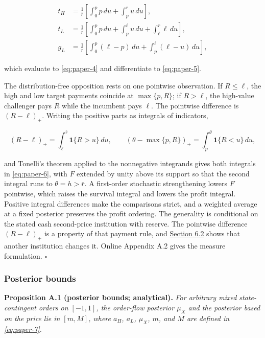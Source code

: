 \documentclass[
  12pt,
]{article}
\begin{document}
\[
\begin{aligned}
t_H&=\frac1r\left[\int_0^p p\,du+\int_p^r u\,du\right],\\
t_L&=\frac1r\left[\int_0^p p\,du+\int_p^\ell u\,du+\int_\ell^r\ell\,du\right],\\
g_L&=\frac1r\left[\int_0^p(\ell-p)\,du+\int_p^\ell(\ell-u)\,du\right],
\end{aligned}
\tag{A.1}\label{eq:paper-a-1}
\]

which evaluate to \eqref{eq:paper-4} and differentiate to
\eqref{eq:paper-5}.

The distribution-free opposition rests on one pointwise observation. If
\(R\le\ell\), the high and low target payments coincide at
\(\max\{p,R\}\); if \(R>\ell\), the high-value challenger pays \(R\)
while the incumbent pays \(\ell\). The pointwise difference is
\((R-\ell)_+\). Writing the positive parts as integrals of indicators,

\[
(R-\ell)_+=\int_\ell^{\bar r}\mathbf1\{R>u\}\,du,
\qquad
(\theta-\max\{p,R\})_+=\int_p^\theta\mathbf1\{R<u\}\,du,
\tag{A.2}\label{eq:paper-a-2}
\]

and Tonelli's theorem applied to the nonnegative integrands gives both
integrals in \eqref{eq:paper-6}, with \(F\) extended by unity above its
support so that the second integral runs to \(\theta=h>\bar r\). A
first-order stochastic strengthening lowers \(F\) pointwise, which
raises the survival integral and lowers the profit integral. Positive
integral differences make the comparisons strict, and a weighted average
at a fixed posterior preserves the profit ordering. The generality is
conditional on the stated cash second-price institution with reserve.
The pointwise difference \((R-\ell)_+\) is a property of that payment
rule, and \hyperref[sec-the-payment-rule]{Section 6.2} shows that
another institution changes it. Online Appendix A.2 gives the measure
formulation. \(\square\)


\subsubsection{Posterior bounds}\label{posterior-bounds}

\protect{}\label{result-proposition-a-1}{\textbf{Proposition
A.1 (posterior bounds; analytical).}} \emph{For arbitrary mixed
state-contingent orders on \([-1,1]\), the order-flow posterior
\(\mu_X\) and the posterior based on the price lie in \([m,M]\), where
\(a_H\), \(a_L\), \(\mu_X\), \(m\), and \(M\) are defined in
\eqref{eq:paper-7}.}
\end{document}
